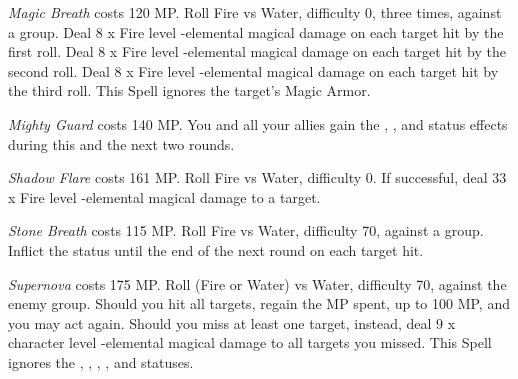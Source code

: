 \begin{multicols}{2}
    \textit{Magic Breath} costs 120 MP\@. Roll Fire vs Water, difficulty 0, three times, against a group. Deal 8 x Fire level -elemental magical damage on each target hit by the first roll. Deal 8 x Fire level -elemental magical damage on each target hit by the second roll. Deal 8 x Fire level -elemental magical damage on each target hit by the third roll. This Spell ignores the target’s Magic Armor.
    
    \textit{Mighty Guard} costs 140 MP\@. You and all your allies gain the , , and  status effects during this and the next two rounds.
    
    \textit{Shadow Flare} costs 161 MP\@. Roll Fire vs Water, difficulty 0. If successful, deal 33 x Fire level -elemental magical damage to a target.
    
    \textit{Stone Breath} costs 115 MP\@. Roll Fire vs Water, difficulty 70, against a group. Inflict the  status until the end of the next round on each target hit.
    
	\textit{Supernova} costs 175 MP\@. Roll (Fire or Water) vs Water, difficulty 70, against the enemy group. Should you hit all targets, regain the MP spent, up to 100 MP, and you may act again. Should you miss at least one target, instead, deal 9 x character level -elemental magical damage to all targets you missed. This Spell ignores the , , , ,  and  statuses.

\end{multicols}
